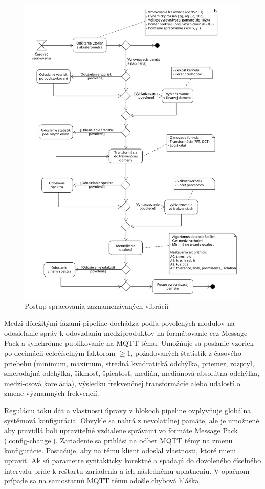 \begin{figure}[h!]
	\centering
	\includegraphics[width=\textwidth]{figures/design/pipeline.png}
	\caption{Postup spracovania zaznamenávaných vibrácií}
	\label{pipeline}
\end{figure}

Medzi dôležitými fázami pipeline dochádza podľa povolených modulov na odosielanie správ k odovzdaniu medziproduktov na formátovanie
cez Message Pack a synchrónne publikovanie na MQTT tému. Umožňuje sa poslanie vzoriek po decimácii celočíselným faktorom $\geq 1$,
požadovaných štatistík z časového priebehu (minimum, maximum, stredná kvadratická odchýlka, priemer, rozptyl, smerodajná odchýlka,
šikmosť, špicatosť, medián, mediánová absolútna odchýlka, medzi-osová korelácia), výsledku frekvenčnej transformácie alebo udalostí
o zmene významných frekvencií.

Reguláciu toku dát a vlastnosti úpravy v blokoch pipeline ovplyvňuje globálna systémová konfigurácia. Obvykle sa nahrá
z nevolatilnej pamäte, ale je umožnené aby pravidlá boli upraviteľné vzdialene správami vo formáte Message Pack (\ref{config-change}).
Zariadenie sa prihlási na odber MQTT témy na zmenu konfigurácie. Postačuje, aby na tému klient odoslal vlastnosti, ktoré mieni
upraviť. Ak sú parametre syntakticky korektné a spadajú do dovoleného číselného intervalu príde k reštartu zariadenia a ich
následnému uplatneniu. V opačnom prípade sa na samostatnú MQTT tému odošle chybová hláška.

